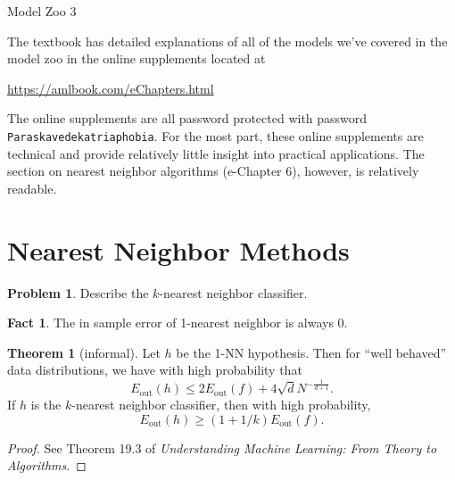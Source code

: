 \documentclass[10pt]{exam}
\theoremstyle{definition}
\newtheorem{problem}{Problem}
\newtheorem{fact}{Fact}
\newtheorem{theorem}{Theorem}
\newcommand{\Eout}{E_{\text{out}}}
\begin{document}
\begin{center}
{
\Huge
Model Zoo 3
}
\end{center}

\noindent
The textbook has detailed explanations of all of the models we've covered in the model zoo in the online supplements located at

\vspace{0.15in}
\url{https://amlbook.com/eChapters.html}

\vspace{0.15in}
\noindent
The online supplements are all password protected with password \lstinline{Paraskavedekatriaphobia}.
For the most part, these online supplements are technical and provide relatively little insight into practical applications.
The section on nearest neighbor algorithms (e-Chapter 6), however, is relatively readable.

\section*{Nearest Neighbor Methods}

\begin{problem}
Describe the $k$-nearest neighbor classifier.
\end{problem}


\newpage
\begin{fact}
    The in sample error of 1-nearest neighbor is always 0.
\end{fact}


\vspace{2in}
\begin{theorem}[informal]
    Let $h$ be the 1-NN hypothesis.
    Then for ``well behaved'' data distributions,
    we have with high probability that
    \begin{equation}
        \Eout(h) \le 2 \Eout(f) + 4 \sqrt{d}N^{-\frac{1}{d+1}}.
    \end{equation}
    If $h$ is the $k$-nearest neighbor classifier,
    then with high probability,
    \begin{equation}
        \Eout(h) \ge (1 + 1/k) \Eout(f)
        .
    \end{equation}
\end{theorem}
\begin{proof}
See Theorem 19.3 of \emph{Understanding Machine Learning: From Theory to Algorithms}.
\end{proof}
\end{document}
